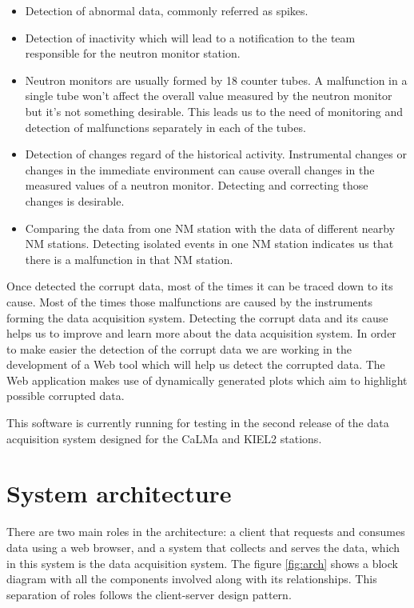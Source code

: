 \documentclass[a4paper]{jpconf}
\begin{document}
\begin{itemize}
    \item   Detection of abnormal data, commonly referred as spikes.
    \item   Detection of inactivity which will lead to a notification to the
        team responsible for the neutron monitor station.
    \item   Neutron monitors are usually formed by 18 counter tubes. A
        malfunction in a single tube won't affect the overall value measured by
        the neutron monitor but it's not something desirable. This leads us to
        the need of monitoring and detection of malfunctions separately in each
        of the tubes.  
    \item   Detection of changes regard of the historical activity.
        Instrumental changes or changes in the immediate environment can cause
        overall changes in the measured values of a neutron monitor. Detecting
        and correcting those changes is desirable.
    \item   Comparing the data from one NM station with the data of different
        nearby NM stations. Detecting isolated events in one NM station
        indicates us that there is a malfunction in that NM station.	
\end{itemize}

Once detected the corrupt data, most of the times it can be traced down to its
cause. Most of the times those malfunctions are caused by the instruments
forming the data acquisition system. Detecting the corrupt data and its cause
helps us to improve and learn more about the data acquisition system. In order
to make easier the detection of the corrupt data we are working in the
development of a Web tool which will help us detect the corrupted data. The Web
application makes use of dynamically generated plots which aim to highlight
possible corrupted data.

This software is currently running for testing in the second release of the data
acquisition system\cite{Garcia2014} designed for the CaLMa\cite{Medina2013} and
KIEL2 stations.


\section{System architecture}

There are two main roles in the architecture: a client that requests and
consumes data using a web browser, and a system that collects and serves the
data, which in this system is the data acquisition system. The figure
\ref{fig:arch} shows a block diagram with all the components involved along with
its relationships. This separation of roles follows the client-server design
pattern\cite{wiki:ClientServer}.
\end{document}
